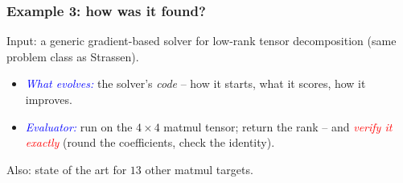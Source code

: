 \documentclass{beamer}
\theoremstyle{definition}
\newcommand\remph[1]{\emph{\textcolor{red}{#1}}}
\newcommand\bemph[1]{\emph{\textcolor{blue}{#1}}}
\begin{document}

\begin{frame}
  \frametitle{Example 3: how was it found?}
  Input: a generic gradient-based solver for low-rank tensor decomposition
  (same problem class as Strassen).
  \pause
  \vspace{.3cm}

  \begin{itemize}
    \item[$\bullet$] \bemph{What evolves:} the solver's \emph{code} --
      how it starts, what it scores, how it improves.
      \pause
    \item[$\bullet$] \bemph{Evaluator:} run on the \( 4 \times 4 \) matmul
      tensor; return the rank -- and \remph{verify it exactly} (round the
      coefficients, check the identity).
  \end{itemize}
  \pause
  \vspace{.3cm}

  Also: state of the art for \( 13 \) other matmul targets.
\end{frame}




\end{document}
